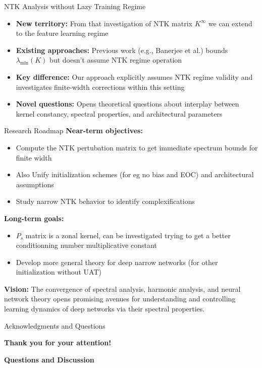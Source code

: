 \documentclass{beamer}
\begin{document}
  
  \begin{frame}{NTK Analysis without Lazy Training Regime}
  \begin{itemize}
  \item \textbf{New territory:} From that investigation of NTK matrix $K^{\infty}$ we can extend to the feature learning regime
  
  \item \textbf{Existing approaches:} Previous work (e.g., Banerjee et al.) bounds $\lambda_{\min}(K)$ but doesn't assume NTK regime operation
  
  \item \textbf{Key difference:} Our approach explicitly assumes NTK regime validity and investigates finite-width corrections within this setting
  
  \item \textbf{Novel questions:} Opens theoretical questions about interplay between kernel constancy, spectral properties, and architectural parameters
  \end{itemize}
  \end{frame}



\begin{frame}{Research Roadmap}
\textbf{Near-term objectives:}
\begin{itemize}
\item Compute the NTK pertubation matrix to get immediate spectrum bounds for finite width
\item Also Unify initialization schemes (for eg no bias and EOC) and architectural assumptions
\item Study narrow NTK behavior to identify complexifications
\end{itemize}

\textbf{Long-term goals:}
\begin{itemize}
\item $P_s$ matrix is a zonal kernel, can be investigated trying to get a better conditionning number multiplicative constant
\item Develop more general theory for deep narrow networks (for other initialization without UAT)
\end{itemize}

\textbf{Vision:} The convergence of spectral analysis, harmonic analysis, and neural network theory opens promising avenues for understanding and controlling learning dynamics of deep networks via their spectral properties.
\end{frame}

\begin{frame}{Acknowledgments and Questions}
\begin{center}
\textbf{Thank you for your attention!}

\vspace{1cm}

\textbf{Questions and Discussion}

\vspace{1cm}

\end{center}
\end{frame}
\end{document}
